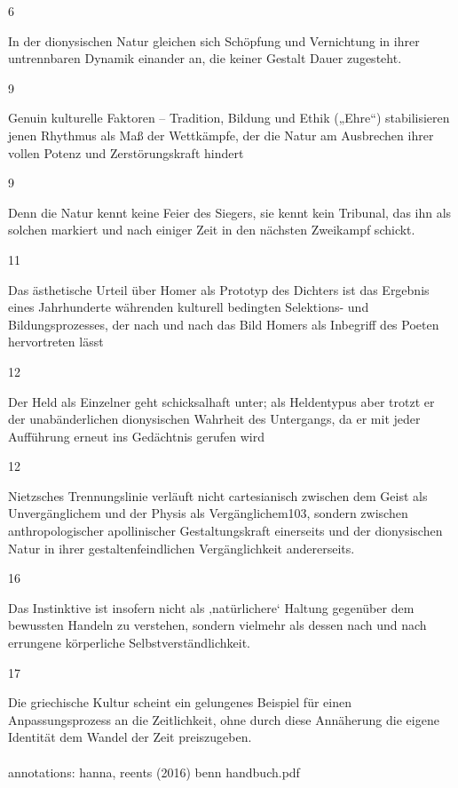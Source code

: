\documentclass[
  letterpaper,
  DIV=11,
  numbers=noendperiod]{scrartcl}
\makeatletter
\let\oldparagraph\paragraph
\renewcommand{\paragraph}{
    \@ifstar
      \xxxParagraphStar
      \xxxParagraphNoStar
  }
\newcommand{\xxxParagraphStar}[1]{\oldparagraph*{#1}\mbox{}}
\newcommand{\xxxParagraphNoStar}[1]{\oldparagraph{#1}\mbox{}}
\makeatother
\begin{document}
6

In der dionysischen Natur gleichen sich Schöpfung und Vernichtung in
ihrer untrennbaren Dynamik einander an, die keiner Gestalt Dauer
zugesteht.

9

Genuin kulturelle Faktoren -- Tradition, Bildung und Ethik („Ehre``)
stabilisieren jenen Rhythmus als Maß der Wettkämpfe, der die Natur am
Ausbrechen ihrer vollen Potenz und Zerstörungskraft hindert

9

Denn die Natur kennt keine Feier des Siegers, sie kennt kein Tribunal,
das ihn als solchen markiert und nach einiger Zeit in den nächsten
Zweikampf schickt.

11

Das ästhetische Urteil über Homer als Prototyp des Dichters ist das
Ergebnis eines Jahrhunderte währenden kulturell bedingten Selektions-
und Bildungsprozesses, der nach und nach das Bild Homers als Inbegriff
des Poeten hervortreten lässt

12

Der Held als Einzelner geht schicksalhaft unter; als Heldentypus aber
trotzt er der unabänderlichen dionysischen Wahrheit des Untergangs, da
er mit jeder Aufführung erneut ins Gedächtnis gerufen wird

12

Nietzsches Trennungslinie verläuft nicht cartesianisch zwischen dem
Geist als Unvergänglichem und der Physis als Vergänglichem103, sondern
zwischen anthropologischer apollinischer Gestaltungskraft einerseits und
der dionysischen Natur in ihrer gestaltenfeindlichen Vergänglichkeit
andererseits.

16

Das Instinktive ist insofern nicht als ‚natürlichere` Haltung gegenüber
dem bewussten Handeln zu verstehen, sondern vielmehr als dessen nach und
nach errungene körperliche Selbstverständlichkeit.

17

Die griechische Kultur scheint ein gelungenes Beispiel für einen
Anpassungsprozess an die Zeitlichkeit, ohne durch diese Annäherung die
eigene Identität dem Wandel der Zeit preiszugeben.

\paragraph{annotations: hanna, reents (2016) benn
handbuch.pdf}\label{annotations-hanna-reents-2016-benn-handbuch.pdf}
\end{document}
